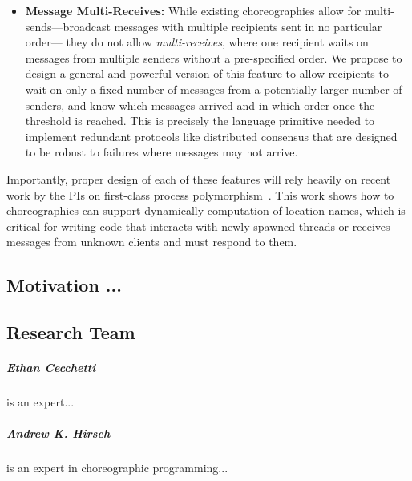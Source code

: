 \begin{itemize}[leftmargin=*]
  \item \textbf{Message Multi-Receives:}
    While existing choreographies allow for multi-sends---broadcast messages with multiple recipients sent in no particular order---%
    they do not allow \emph{multi-receives}, where one recipient waits on messages from multiple senders without a pre-specified order.
    We propose to design a general and powerful version of this feature
    to allow recipients to wait on only a fixed number of messages from a potentially larger number of senders,
    and know which messages arrived and in which order once the threshold is reached.
    This is precisely the language primitive needed to implement redundant protocols like distributed consensus
    that are designed to be robust to failures where messages may not arrive.
\end{itemize}

Importantly, proper design of each of these features will rely heavily
on recent work by the PIs on first-class process polymorphism~\citep{SamuelsonHC25}.
This work shows how to choreographies can support dynamically computation of location names,
which is critical for writing code that interacts with newly spawned threads
or receives messages from unknown clients and must respond to them.

\subsection{Motivation ...}
\label{sec:motivation}


\subsection{Research Team}

\subparagraph{Ethan Cecchetti} is an expert...

\subparagraph{Andrew K. Hirsch} is an expert in choreographic programming...

